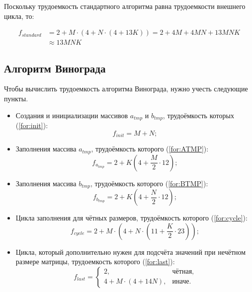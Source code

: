 Поскольку трудоемкость стандартного алгоритма равна трудоемкости внешнего цикла, то:

\begin{align}
	\label{for:standard}
	f_{standard} &= 2 + M \cdot (4 + N \cdot (4 + 13K)) = 2 + 4M + 4MN + 13MNK\\ &\approx 13MNK
\end{align}


\subsection{Алгоритм Винограда}

Чтобы вычислить трудоемкость алгоритма Винограда, нужно учесть следующие пункты.

\begin{itemize}
	\item Создания и инициализации массивов $a_{tmp}$ и $b_{tmp}$, трудоёмкость которых (\ref{for:init}):
	\begin{equation}
		\label{for:init}
		f_{init} = M + N;
	\end{equation}
	
	\item Заполнения массива $a_{tmp}$, трудоёмкость которого (\ref{for:ATMP}):
	\begin{equation}
		\label{for:ATMP}
		f_{a_{tmp}} = 2 + K (4 + \frac{M}{2} \cdot 12);
	\end{equation}
	
	\item Заполнения массива $b_{tmp}$, трудоёмкость которого (\ref{for:BTMP}):
	\begin{equation}
		\label{for:BTMP}
		f_{b_{tmp}} = 2 + K (4 + \frac{N}{2} \cdot 12);
	\end{equation}
	
	\item Цикла заполнения для чётных размеров, трудоёмкость которого (\ref{for:cycle}):
	\begin{equation}
		\label{sfor:cycle}
		f_{cycle} = 2 + M \cdot (4 + N \cdot (11 + \frac{K}{2} \cdot 23));
	\end{equation}
	
	\item Цикла, который дополнительно нужен для подсчёта значений при нечётном размере матрицы, трудоемкость которого (\ref{for:last}):
	\begin{equation}
		\label{for:last}
		f_{last} = \begin{cases}
			2, & \text{чётная,}\\
			4 + M \cdot (4 + 14N), & \text{иначе.}
		\end{cases}
	\end{equation}
\end{itemize}

